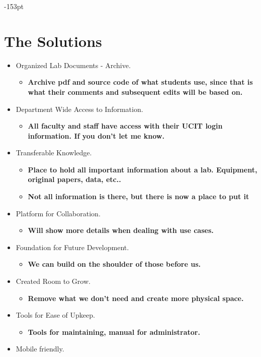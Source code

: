 \begin{adjustwidth}{}{-153pt}
\section{\bf The Solutions}
\begin{itemize}
\item Organized Lab Documents - Archive.
	\begin{itemize} 
	\item {\bf Archive pdf and source code of what students use, since that is what their comments and subsequent edits will be based on.} 
	\end{itemize}
\item Department Wide Access to Information.
	\begin{itemize} 
	\item {\bf All faculty and staff have access with their UCIT login information. If you don't let me know.} 
	\end{itemize}
\item Transferable Knowledge.
	\begin{itemize} 
	\item {\bf Place to hold all important information about a lab. Equipment, original papers, data, etc..}
	\item {\bf Not all information is there, but there is now a place to put it}
	 \end{itemize}
\item Platform for Collaboration.
	\begin{itemize}
	\item {\bf Will show more details when dealing with use cases.}
	\end{itemize}
\item Foundation for Future Development.
	\begin{itemize}
	\item {\bf We can build on the shoulder of those before us.}
	\end{itemize}
\item Created Room to Grow.
	\begin{itemize}
	\item {\bf Remove what we don't need and create more physical space.}
	\end{itemize}
\item Tools for Ease of Upkeep.
	\begin{itemize} \item {\bf Tools for maintaining, manual for administrator.}\end{itemize}
	\item Mobile friendly.
\end{itemize}


\end{adjustwidth}
